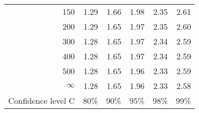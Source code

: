 \begin{center}
\begin{tabular}{r | rrr rr}
\hline
150  &  {\normalsize  1.29} & {\normalsize  1.66} & {\normalsize  1.98} & {\normalsize  2.35} & {\normalsize  2.61}  \\ 
200  &  {\normalsize  1.29} & {\normalsize  1.65} & {\normalsize  1.97} & {\normalsize  2.35} & {\normalsize  2.60}  \\ 
300  &  {\normalsize  1.28} & {\normalsize  1.65} & {\normalsize  1.97} & {\normalsize  2.34} & {\normalsize  2.59}  \\ 
400  &  {\normalsize  1.28} & {\normalsize  1.65} & {\normalsize  1.97} & {\normalsize  2.34} & {\normalsize  2.59}  \\ 
500  &  {\normalsize  1.28} & {\normalsize  1.65} & {\normalsize  1.96} & {\normalsize  2.33} & {\normalsize  2.59}  \\ 
$\infty$  &  {\normalsize  1.28} & {\normalsize  1.65} & {\normalsize  1.96} & {\normalsize  2.33} & {\normalsize  2.58}  \\ 
\hline
Confidence level C  &  {\normalsize  80\%} & {\normalsize 90\%} & {\normalsize 95\%} & {\normalsize  98\%} & {\normalsize  99\%}  \\
\hline
\end{tabular}
\end{center}

